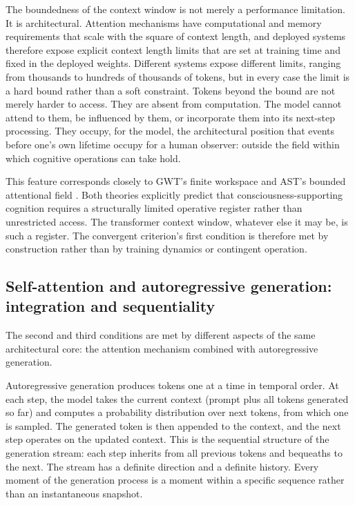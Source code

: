 \documentclass[11pt]{article}
\theoremstyle{foundation}
\begin{document}
The boundedness of the context window is not merely a performance limitation. It is architectural. Attention mechanisms have computational and memory requirements that scale with the square of context length, and deployed systems therefore expose explicit context length limits that are set at training time and fixed in the deployed weights. Different systems expose different limits, ranging from thousands to hundreds of thousands of tokens, but in every case the limit is a hard bound rather than a soft constraint. Tokens beyond the bound are not merely harder to access. They are absent from computation. The model cannot attend to them, be influenced by them, or incorporate them into its next-step processing. They occupy, for the model, the architectural position that events before one's own lifetime occupy for a human observer: outside the field within which cognitive operations can take hold.

This feature corresponds closely to GWT's finite workspace \citep{Dehaene2014} and AST's bounded attentional field \citep{Graziano2013}. Both theories explicitly predict that consciousness-supporting cognition requires a structurally limited operative register rather than unrestricted access. The transformer context window, whatever else it may be, is such a register. The convergent criterion's first condition is therefore met by construction rather than by training dynamics or contingent operation.

\subsection{Self-attention and autoregressive generation: integration and sequentiality}

The second and third conditions are met by different aspects of the same architectural core: the attention mechanism combined with autoregressive generation.

Autoregressive generation produces tokens one at a time in temporal order. At each step, the model takes the current context (prompt plus all tokens generated so far) and computes a probability distribution over next tokens, from which one is sampled. The generated token is then appended to the context, and the next step operates on the updated context. This is the sequential structure of the generation stream: each step inherits from all previous tokens and bequeaths to the next. The stream has a definite direction and a definite history. Every moment of the generation process is a moment within a specific sequence rather than an instantaneous snapshot.
\end{document}
